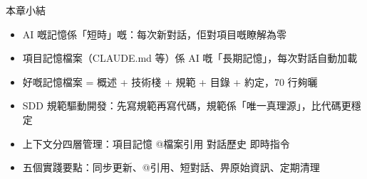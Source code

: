 \begin{tcbsummary}{本章小結}
\begin{itemize}
  \item AI 嘅記憶係「短時」嘅：每次新對話，佢對項目嘅瞭解為零
  \item 項目記憶檔案（CLAUDE.md 等）係 AI 嘅「長期記憶」，每次對話自動加載
  \item 好嘅記憶檔案 = 概述 + 技術棧 + 規範 + 目錄 + 約定，70 行夠曬
  \item SDD 規範驅動開發：先寫規範再寫代碼，規範係「唯一真理源」，比代碼更穩定
  \item 上下文分四層管理：項目記憶 @檔案引用 對話歷史 即時指令
  \item 五個實踐要點：同步更新、@引用、短對話、畀原始資訊、定期清理
\end{itemize}

\end{tcbsummary}
